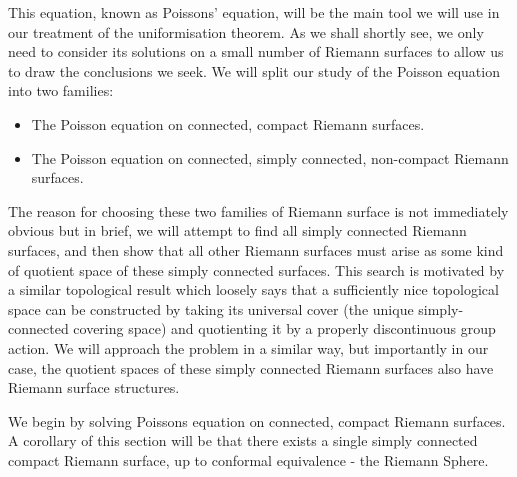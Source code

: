 \documentclass[11pt]{report}
\theoremstyle{definition}
\begin{document}
This equation, known as Poissons' equation, will be the main tool we will use in our treatment of the uniformisation theorem. As we shall shortly see, we only need to consider its solutions on a small number of Riemann surfaces to allow us to draw the conclusions we seek. We will split our study of the Poisson equation into two families:
\begin{itemize}
  \item The Poisson equation on connected, compact Riemann surfaces.
  \item The Poisson equation on connected, simply connected, non-compact Riemann surfaces.
\end{itemize}
The reason for choosing these two families of Riemann surface is not immediately obvious but in brief, we will attempt to find all simply connected Riemann surfaces, and then show that all other Riemann surfaces must arise as some kind of quotient space of these simply connected surfaces. This search is motivated by a similar topological result which loosely says that a sufficiently nice topological space can be constructed by taking its universal cover (the unique simply-connected covering space) and quotienting it by a properly discontinuous group action. We will approach the problem in a similar way, but importantly in our case, the quotient spaces of these simply connected Riemann surfaces also have Riemann surface structures.

We begin by solving Poissons equation on connected, compact Riemann surfaces. A corollary of this section will be that there exists a single simply connected compact Riemann surface, up to conformal equivalence - the Riemann Sphere. 
\end{document}
